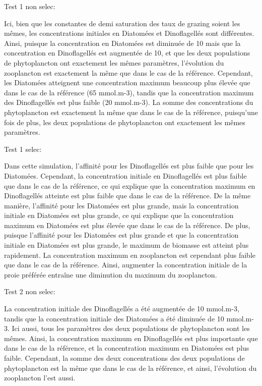 Test 1 non selec:

Ici, bien que les constantes de demi saturation des taux de grazing soient les mêmes, les concentrations initiales en Diatomées et Dinoflagellés sont différentes. Ainsi, puisque la concentration en Diatomées est diminuée de 10 mais que la concentration en Dinoflagellés est augmentée de 10, et que les deux populations de phytoplancton ont exactement les mêmes paramètres, l'évolution du zooplancton est exactement la même que dans le cas de la référence. Cependant, les Diatomées atteignent une concentration maximum beaucoup plus élevée que dans le cas de la référence (65 mmol.m-3), tandis que la concentration maximum des Dinoflagellés est plus faible (20 mmol.m-3). La somme des concentrations du phytoplancton est exactement la même que dans le cas de la référence, puisqu'une fois de plus, les deux populations de phytoplancton ont exactement les mêmes paramètres.

Test 1 selec: 

Dans cette simulation, l'affinité pour les Dinoflagellés est plus faible que pour les Diatomées. Cependant, la concentration initiale en Dinoflagellés est plus faible que dans le cas de la référence, ce qui explique que la concentration maximum en Dinoflagellés atteinte est plus faible que dans le cas de la référence.
De la même manière, l'affinité pour les Diatomées est plus grande, mais la concentration initiale en Diatomées est plus grande, ce qui explique que la concentration maximum en Diatomées est plus élevée que dans le cas de la référence.
De plus, puisque l'affinité pour les Diatomées est plus grande et que la concentration initiale en Diatomées est plus grande, le maximum de biomasse est atteint plus rapidement. 
La concentration maximum en zooplancton est cependant plus faible que dans le cas de la référence. Ainsi, augmenter la concentration initiale de la proie préférée entraîne une diminution du maximum du zooplancton. 

Test 2 non selec:

La concentration initiale des Dinoflagellés a été augmentée de 10 mmol.m-3, tandis que la concentration initiale des Diatomées a été diminuée de 10 mmol.m-3. Ici aussi, tous les paramètres des deux populations de phytoplancton sont les mêmes. Ainsi, la concentration maximum en Dinoflagellés est plus importante que dans le cas de la référence, et la concentration maximum en Diatomées est plus faible. Cependant, la somme des deux concentrations des deux populations de phytoplancton est la même que dans le cas de la référence, et ainsi, l'évolution du zooplancton l'est aussi.

